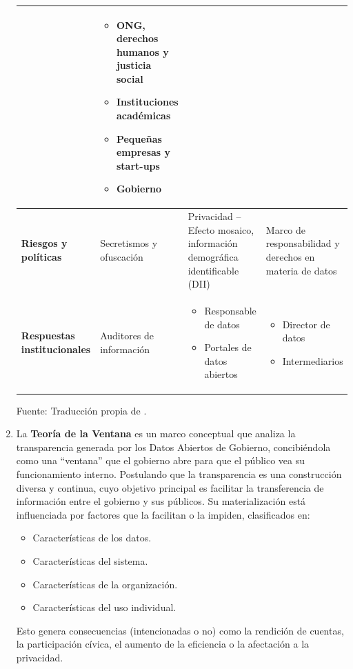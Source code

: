 \begin{enumerate}
\begin{table}
{\begin{tabular}{|p{3cm}|p{4cm}|p{4cm}|p{5cm}|}
				& 
				\begin{itemize}
					\item ONG, derechos humanos y justicia social
					\item Instituciones académicas
					\item Pequeñas empresas y start-ups
					\item Gobierno
				\end{itemize} \\
				\hline
				\textbf{Riesgos y políticas} & Secretismos y ofuscación & Privacidad -- Efecto mosaico, información demográfica identificable (DII) & Marco de responsabilidad y derechos en materia de datos \\
				\hline
				\textbf{Respuestas institucionales} & Auditores de información & 
				\begin{itemize}
					\item Responsable de datos
					\item Portales de datos abiertos
				\end{itemize}
				& 
				\begin{itemize}
					\item Director de datos
					\item Intermediarios
				\end{itemize} \\
				\hline
			\end{tabular}
		}
		\vspace{0.5em}
		
		\footnotesize Fuente: Traducción propia de \cite{verhulst2020}. \\
	\end{table}

	\item La \textbf{Teoría de la Ventana} \label{def6} \citep{Matheus03052020} es un marco conceptual que analiza la transparencia generada por los Datos Abiertos de Gobierno, concibiéndola como una ``ventana'' que el gobierno abre para que el público vea su funcionamiento interno. Postulando que la transparencia es una construcción diversa y continua, cuyo objetivo principal es facilitar la transferencia de información entre el gobierno y sus públicos. Su materialización está influenciada por factores que la facilitan o la impiden, clasificados en:
	\begin{itemize}
		\item Características de los datos.
		\item Características del sistema.
		\item Características de la organización.
		\item Características del uso individual.
	\end{itemize}
	Esto genera consecuencias (intencionadas o no) como la rendición de cuentas, la participación cívica, el aumento de la eficiencia o la afectación a la privacidad. \\
	

\end{enumerate}
